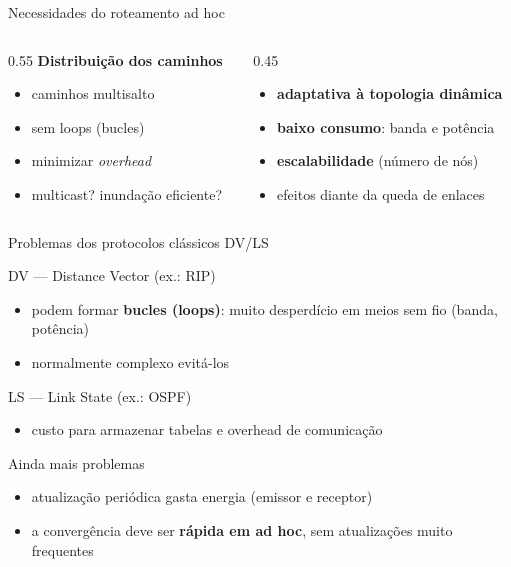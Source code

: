 \documentclass[aspectratio=169,11pt]{beamer}
\begin{document}
\begin{frame}{Necessidades do roteamento ad hoc}
  \begin{columns}
    \begin{column}{0.55\textwidth}
      \textbf{Distribuição dos caminhos}
      \begin{itemize}
        \item caminhos multisalto
        \item sem loops (bucles)
        \item minimizar \emph{overhead}
        \item multicast? inundação eficiente?
      \end{itemize}
    \end{column}
    \begin{column}{0.45\textwidth}
      \begin{itemize}
        \item \textbf{adaptativa à topologia dinâmica}
        \item \textbf{baixo consumo}: banda e potência
        \item \textbf{escalabilidade} (número de nós)
        \item efeitos diante da queda de enlaces
      \end{itemize}
    \end{column}
  \end{columns}
\end{frame}

\begin{frame}{Problemas dos protocolos clássicos DV/LS}
  \begin{block}{DV --- Distance Vector (ex.: RIP)}
    \begin{itemize}
      \item podem formar \textbf{bucles (loops)}: muito desperdício em meios sem fio (banda, potência)
      \item normalmente complexo evitá-los
    \end{itemize}
  \end{block}
  \begin{block}{LS --- Link State (ex.: OSPF)}
    \begin{itemize}
      \item custo para armazenar tabelas e overhead de comunicação
    \end{itemize}
  \end{block}
  \begin{alertblock}{Ainda mais problemas}
    \begin{itemize}
      \item atualização periódica gasta energia (emissor e receptor)
      \item a convergência deve ser \textbf{rápida em ad hoc}, sem atualizações muito frequentes
    \end{itemize}
  \end{alertblock}
\end{frame}
\end{document}
